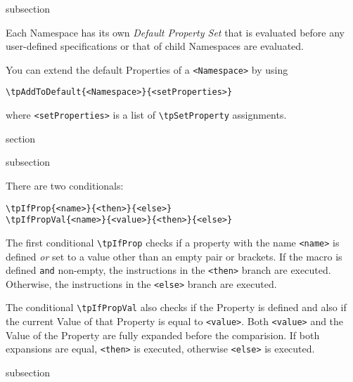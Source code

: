 \begin{Heading}{subsection}
\end{Heading}

Each Namespace has its own \textit{Default Property Set} that is
evaluated before any user-defined specifications or that of child
Namespaces are evaluated.

You can extend the default Properties of a \lstinline{<Namespace>} by
using
\begin{lstlisting}[style=tex]
\tpAddToDefault{<Namespace>}{<setProperties>}
\end{lstlisting}
where \lstinline{<setProperties>} is a list of \lstinline{\tpSetProperty}
assignments.\Hack{\newpage}

\begin{Heading}{section}
\end{Heading}

\begin{Heading}{subsection}
\end{Heading}

There are two conditionals:
\begin{lstlisting}[style=tex]
\tpIfProp{<name>}{<then>}{<else>}
\tpIfPropVal{<name>}{<value>}{<then>}{<else>}
\end{lstlisting}
The first conditional \lstinline{\tpIfProp} checks if a property with
the name \lstinline{<name>} is defined \textit{or} set to a value
other than an empty pair or brackets. If the macro is defined
\lstinline{and} non-empty, the instructions in the \lstinline{<then>}
branch are executed. Otherwise, the instructions in the
\lstinline{<else>} branch are executed.

The conditional \lstinline{\tpIfPropVal} also checks if the Property
is defined and also if the current Value of that Property is equal to
\lstinline{<value>}. Both \lstinline{<value>} and the Value of the
Property are fully expanded before the comparision. If both expansions
are equal, \lstinline{<then>} is executed, otherwise
\lstinline{<else>} is executed.

\begin{Heading}{subsection}
\end{Heading}

